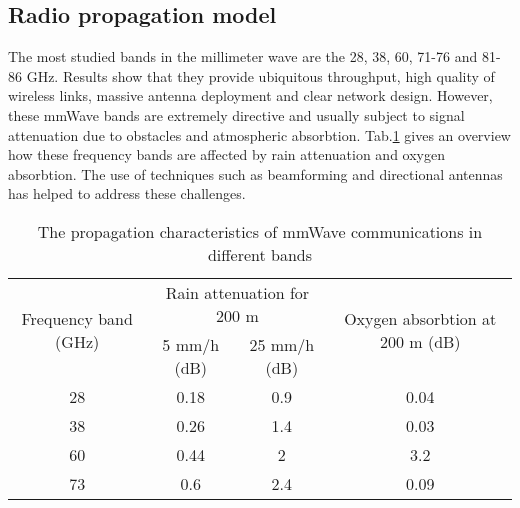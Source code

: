 \documentclass[conference,onecolumn,12pt]{IEEEtran}
\begin{document}
\subsection{Radio propagation model}
The most studied bands in the millimeter wave are the 28, 38, 60, 71-76 and 81-86 GHz. Results show that they provide ubiquitous throughput, high quality of wireless links, massive antenna deployment and clear network design. However, these mmWave bands are extremely directive and usually subject to signal attenuation due to obstacles and atmospheric absorbtion. Tab.\ref{mmWattenuation} gives an overview how these frequency bands are affected by rain attenuation and oxygen absorbtion. The use of techniques such as beamforming and directional antennas has helped to address these challenges.
\begin{table}[!t]
\caption{The propagation characteristics of mmWave communications in different bands\cite{mmWlimits}} \label{mmWattenuation}
\center
\begin{center}
\begin{tabular}{|c|c|c|c|}
  \hline
    \multirow{2}{1.5cm}{Frequency  band (GHz)}& \multicolumn{2}{|c|}{Rain attenuation for 200 m }&\multirow{2}{2.3cm}{Oxygen absorbtion at 200 m (dB)} \\ \cline{2-3}
&5 mm/h (dB)& 25 mm/h (dB)& \\ \hline
  28 & 0.18 & 0.9 & 0.04 \\\hline
  38 & 0.26 & 1.4 & 0.03 \\\hline
  60 & 0.44 & 2 & 3.2 \\\hline
  73 & 0.6 & 2.4 & 0.09 \\\hline
  \hline
\end{tabular}
\end{center}
\end{table}
\end{document}
